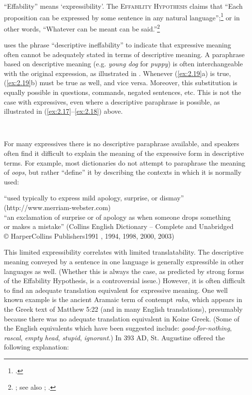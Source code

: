 “Effability” means ‘expressibility’. The \textsc{Effability} \textsc{Hypothesis} claims that “Each proposition can be expressed by some sentence in any natural language”;\footnote{\citet[209]{Katz1978}.} or in other words, “Whatever can be meant can be said.”\footnote{\citet[18]{Searle1969}; see also \citet[18-24]{Katz1972}; \citet[33]{Carston2002}.}



\citet{Potts2007c} uses the phrase “descriptive ineffability” to indicate that expressive meaning often cannot be adequately stated in terms of descriptive meaning. A paraphrase based on descriptive meaning (e.g. \textit{young dog} for \textit{puppy}) is often interchangeable with the original expression, as illustrated in . Whenever (\ref{ex:2.19}a) is true, (\ref{ex:2.19}b) must be true as well, and vice versa. Moreover, this substitution is equally possible in questions, commands, negated sentences, etc. This is not the case with expressives, even where a descriptive paraphrase is possible, as illustrated in (\ref{ex:2.17}--\ref{ex:2.18}) above.


\ea \label{ex:2.19}
\\
                       \z
\z


For many expressives there is no descriptive paraphrase available, and speakers often find it difficult to explain the meaning of the expressive form in descriptive terms. For example, most dictionaries do not attempt to paraphrase the meaning of \textit{oops}, but rather “define” it by describing the contexts in which it is normally used:


\ea

\ea “used typically to express mild apology, surprise, or dismay”\\
  (http://www.merriam-webster.com)\\
\ex “an exclamation of surprise or of apology as when someone drops something\\
  or makes a mistake” (Collins English Dictionary – Complete and Unabridged\\
  © HarperCollins Publishers1991 , 1994, 1998, 2000, 2003)
\z
\z


This limited expressibility correlates with limited translatability. The descriptive meaning conveyed by a sentence in one language is generally expressible in other languages as well. (Whether this is always the case, as predicted by strong forms of the Effability Hypothesis, is a controversial issue.) However, it is often difficult to find an adequate translation equivalent for expressive meaning. One well known example is the ancient Aramaic term of contempt \textit{raka}, which appears in the Greek text of Matthew 5:22 (and in many English translations), presumably because there was no adequate translation equivalent in Koine Greek. (Some of the English equivalents which have been suggested include: \textit{good-for-nothing}, \textit{rascal}, \textit{empty head}, \textit{stupid}, \textit{ignorant}.) In 393 AD, St. Augustine offered the following explanation:


